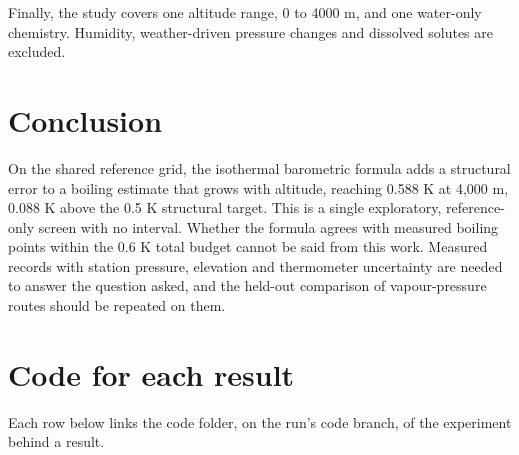 \documentclass[11pt,letterpaper]{article}
\begin{document}
Finally, the study covers one altitude range, 0 to 4000 m, and one water-only chemistry. Humidity, weather-driven pressure changes and dissolved solutes are excluded.

\section{Conclusion}\label{sec:conclusion}

On the shared reference grid, the isothermal barometric formula adds a structural error to a boiling estimate that grows with altitude, reaching 0.588 K at 4,000 m, 0.088 K above the 0.5 K structural target. This is a single exploratory, reference-only screen with no interval. Whether the formula agrees with measured boiling points within the 0.6 K total budget cannot be said from this work. Measured records with station pressure, elevation and thermometer uncertainty are needed to answer the question asked, and the held-out comparison of vapour-pressure routes should be repeated on them.

\clearpage



\clearpage
\appendix
\section{Code for each result}\label{app:code}

Each row below links the code folder, on the run's code branch, of the experiment behind a result.
\end{document}
